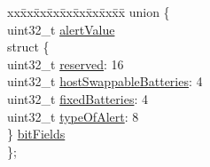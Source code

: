 \begin{DoxyCompactItemize}
\begin{tabbing}
\end{tabbing}\item 
\begin{tabbing}
xx\=xx\=xx\=xx\=xx\=xx\=xx\=xx\=xx\=\kill
union \{\\
\>uint32\_t \hyperlink{struct__pd__alert__data__object_aed9a5657c490967d07dd7961217bc0f2}{alertValue}\\
\>struct \{\\
\>\>uint32\_t \hyperlink{struct__pd__alert__data__object_a23d29e1d570b84c87f3ff7832fc282f4}{reserved}: 16\\
\>\>uint32\_t \hyperlink{struct__pd__alert__data__object_ab4e7f83416c6dda7638828545fa92109}{hostSwappableBatteries}: 4\\
\>\>uint32\_t \hyperlink{struct__pd__alert__data__object_aece8b77da3ae31996a4aad59924f47f7}{fixedBatteries}: 4\\
\>\>uint32\_t \hyperlink{struct__pd__alert__data__object_ad73d27b0e318aafc2aeb84ab5eb487b2}{typeOfAlert}: 8\\
\>\} \hyperlink{struct__pd__alert__data__object_a73b0e792258da5268f6fc612e1e7617b}{bitFields}\\
\}; \\

\end{tabbing}\end{DoxyCompactItemize}


